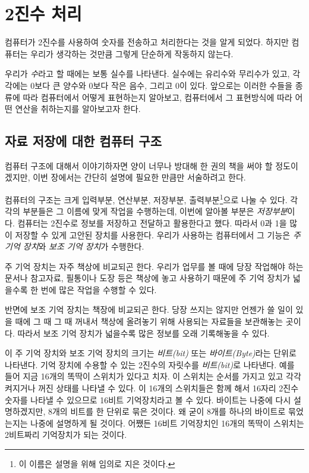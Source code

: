 \documentclass{article}
\begin{document}
\section{2진수 처리}

컴퓨터가 2진수를 사용하여 숫자를 전송하고 처리한다는 것을 알게 되었다.
하지만 컴퓨터는 우리가 생각하는 것만큼 그렇게 단순하게 작동하지 않는다.

우리가 \textit{수}라고 할 때에는 보통 실수를 나타낸다. 실수에는 유리수와 무리수가 있고,
각각에는 0보다 큰 양수와 0보다 작은 음수, 그리고 0이 있다.
앞으로는 이러한 수들을 종류에 따라 컴퓨터에서
어떻게 표현하는지 알아보고, 컴퓨터에서 그 표현방식에 따라 어떤 연산을 취하는지를 알아보고자
한다.

\subsection{자료 저장에 대한 컴퓨터 구조}

컴퓨터 구조에 대해서 이야기하자면 양이 너무나 방대해 한 권의 책을 써야 할 정도이겠지만,
이번 장에서는 간단히 설명에 필요한 만큼만 서술하려고 한다.

컴퓨터의 구조는 크게 입력부분, 연산부분, 저장부분, 출력부분\footnote{이 이름은
설명을 위해 임의로 지은 것이다.}으로 나눌 수 있다.
각각의 부분들은 그 이름에 맞게 작업을 수행하는데, 이번에 알아볼 부분은 \textit{저장부분}이다.
컴퓨터는 2진수로 정보를 저장하고 전달하고 활용한다고 했다. 따라서 0과 1을 많이 저장할 수 있게
고안된 장치를 사용한다. 우리가 사용하는 컴퓨터에서 그 기능은 \textit{주 기억 장치}와
\textit{보조 기억 장치}가 수행한다.

주 기억 장치는 자주 책상에 비교되곤 한다. 우리가 업무를 볼 때에 당장 작업해야 하는 문서나
참고자료, 필통이나 도장 등은 책상에 놓고 사용하기 때문에 주 기억 장치가 넓을수록 한 번에 많은
작업을 수행할 수 있다.

반면에 보조 기억 장치는 책장에 비교되곤 한다. 당장 쓰지는 않지만 언젠가 쓸 일이 있을 때에
그 때 그 때 꺼내서 책상에 올려놓기 위해 사용되는 자료들을 보관해놓는 곳이다. 따라서 보조 기억
장치가 넓을수록 많은 정보를 오래 기록해놓을 수 있다.

이 주 기억 장치와 보조 기억 장치의 크기는 \textit{비트(bit)} 또는 \textit{바이트(Byte)}라는
단위로
나타낸다. 기억 장치에 수용할 수 있는 2진수의 자릿수를 \textit{비트(bit)}로 나타낸다. 예를 들어
지금 16개의 똑딱이 스위치가 있다고 치자. 이 스위치는 순서를 가지고 있고 각각 켜지거나
꺼진 상태를 나타낼 수 있다. 이 16개의 스위치들은 함께 해서 16자리 2진수 숫자를 나타낼 수
있으므로 16비트 기억장치라고 볼 수 있다. 바이트는 나중에 다시 설명하겠지만, 8개의 비트를
한 단위로 묶은 것이다. 왜 굳이 8개를 하나의 바이트로 묶었는지는 나중에 설명하게 될 것이다.
어쨌든 16비트 기억장치인 16개의 똑딱이 스위치는 2비트짜리 기억장치가 되는 것이다.
\end{document}
